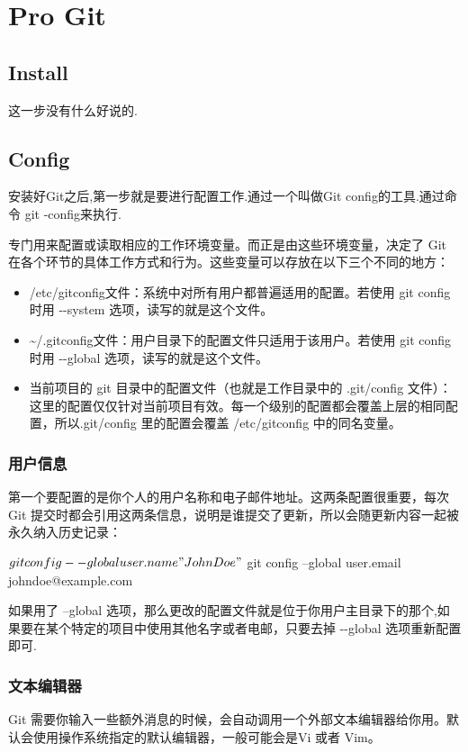 \chapter{Pro Git}

\section{Install}
这一步没有什么好说的.

\section{Config}
安装好Git之后,第一步就是要进行配置工作.通过一个叫做Git config的工具.通过命令 git -config来执行.

专门用来配置或读取相应的工作环境变量。而正是由这些环境变量，决定了 Git 在各个环节的具体工作方式和行为。这些变量可以存放在以下三个不同的地方：
\begin{itemize}
\item /etc/gitconfig文件：系统中对所有用户都普遍适用的配置。若使用 git config 时用 -{}-system 选项，读写的就是这个文件。

\item \textasciitilde/.gitconfig文件：用户目录下的配置文件只适用于该用户。若使用 git config 时用 -{}-global 选项，读写的就是这个文件。

\item 当前项目的 git 目录中的配置文件（也就是工作目录中的 .git/config 文件）：这里的配置仅仅针对当前项目有效。每一个级别的配置都会覆盖上层的相同配置，所以.git/config 里的配置会覆盖 /etc/gitconfig 中的同名变量。

\end{itemize}

\subsection{用户信息}
第一个要配置的是你个人的用户名称和电子邮件地址。这两条配置很重要，每次 Git 提交时都会引用这两条信息，说明是谁提交了更新，所以会随更新内容一起被永久纳入历史记录：
\begin{CMD}
$ git config --global user.name "John Doe"
$ git config --global user.email johndoe@example.com
\end{CMD}

如果用了 --global 选项，那么更改的配置文件就是位于你用户主目录下的那个,如果要在某个特定的项目中使用其他名字或者电邮，只要去掉 -{}-global 选项重新配置即可.

\subsection{文本编辑器}
Git 需要你输入一些额外消息的时候，会自动调用一个外部文本编辑器给你用。默认会使用操作系统指定的默认编辑器，一般可能会是Vi 或者 Vim。

